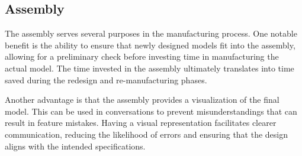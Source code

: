 \documentclass[../report.tex]{subfiles}
\begin{document}
\subsection{Assembly}
    The assembly serves several purposes in the manufacturing process. One
    notable benefit is the ability to ensure that newly designed models fit
    into the assembly, allowing for a preliminary check before investing time
    in manufacturing the actual model. The time invested in the assembly
    ultimately translates into time saved during the redesign and
    re-manufacturing phases.

    Another advantage is that the assembly provides a visualization of the
    final model. This can be used in conversations to prevent misunderstandings
    that can result in feature mistakes. Having a visual representation
    facilitates clearer communication, reducing the likelihood of errors and
    ensuring that the design aligns with the intended specifications.
\end{document}
